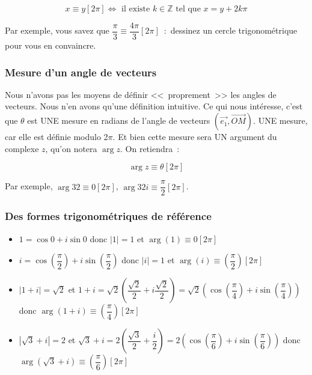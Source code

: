 \documentclass[french]{book}
\newcommand{\bbz}{\mathbb {Z}}
\newcommand{\fr}[2]{\dfrac{#1}{#2}}
\newcommand{\ve}[1]{\overrightarrow{#1}}
\newcommand{\pa}[1]{(#1)}
\newcommand{\ssi}{\Longleftrightarrow}
\newcommand{\ud}[1]{\dfrac{#1}{2}}
\newcommand{\cacher}[1]{#1}
\begin{document}
  \begin{rem}
    \[x\equiv y[2\pi]\ssi \text{ il existe } k\in\bbz \text{ tel que } x=y+2k\pi\]
    \end{rem}
  


Par      exemple,       vous      savez      que      $\fr{\pi}{3}\equiv
\fr{4\pi}{3}[2\pi]$~:~dessinez un cercle 
trigonométrique pour vous en convaincre.

\subsubsection{Mesure d'un angle de vecteurs}

Nous n'avons  pas les moyens  de définir <<~proprement~>> les  angles de
vecteurs.  Nous n'en  avons  qu'une définition  intuitive.  Ce qui  nous
intéresse, c'est  que $\theta$ est UNE  mesure en radians  de l'angle de
vecteurs  $\pa{\ve{e_1},\ve{OM}}$.  UNE  mesure,  car elle  est  définie
modulo 2$\pi$.  Et bien cette mesure  sera UN argument  du complexe $z$,
qu'on notera $\arg z$. 
On retiendra~:


  \begin{prop}[argument]
    \[\arg z\equiv \theta[2\pi]\]
    \end{prop}
  



Par exemple, $\arg 32\equiv 0[2\pi]$, $\arg 32 i\equiv \fr{\pi}{2}[2\pi]$.

\subsubsection{Des formes trigonométriques de référence}

\begin{itemize}

\item[$\bullet$] $1=\cos 0+i\sin 0$  donc \cacher{$|1|=1$ et $\arg(1)\equiv 0[2\pi]$}
\item[$\bullet$]         $i=\cos\pa{\fr{\pi}{2}}+i\sin\pa{\fr{\pi}{2}}$        donc
  \cacher{$|i|=1$ et $\arg(i)\equiv\pa{\fr{\pi}{2}}[2\pi]$} 
\item[$\bullet$]                         $|1+i|=\sqrt{2}$                        et
  $1+i=\sqrt{2}\pa{\fr{\sqrt{2}}{2}+i\fr{\sqrt{2}}{2}}=$\cacher{$\sqrt{2}\pa{\cos\pa{\fr{\pi}{4}}+i\sin\pa{\fr{\pi}{4}}}$} 
donc \cacher{$\arg(1+i)\equiv\pa{\fr{\pi}{4}}[2\pi]$} 
\item[$\bullet$]    $|\sqrt{3}+i|=2$    et    $\sqrt{3}+i=2\pa{\fr{\sqrt{3}}{2}+\ud
    i}=$\cacher{$2\pa{\cos\pa{\fr{\pi}{6}}+i\sin\pa{\fr{\pi}{6}}}$} 
donc \cacher{$\arg(\sqrt{3}+i)\equiv\pa{\fr{\pi}{6}}[2\pi]$} 
\end{itemize}
\end{document}
